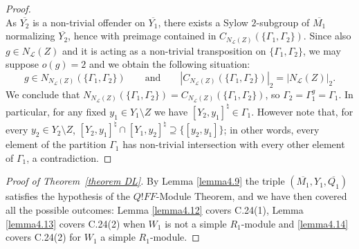 \documentclass{amsart}
\numberwithin{equation}{section}
\theoremstyle{definition}
\theoremstyle{subresult}
\theoremstyle{caseresult}
\renewcommand{\L}{\mathcal{L}}
\newcommand{\ov}{\overline}
\newcommand{\<}{\langle}
\renewcommand{\>}{\rangle}
\begin{document}
\begin{proof}
\[	\]
	As $\ov{Y_2}$ is a non-trivial offender on $\ov{Y_1}$, there exists a Sylow $2$-subgroup of $\ov{M_1}$ normalizing $\ov{Y_2}$, hence with preimage contained in $C_{N_\L(Z)}(\{ \Gamma_1, \Gamma_2 \})$. Since also $g \in N_\L(Z)$ and it is acting as a non-trivial transposition on $\{\Gamma_1,\Gamma_2\}$, we may suppose $o(g)=2$ and we obtain the following situation:
	\[
	g \in N_{N_\L(Z)}(\{\Gamma_1,\Gamma_2\}) \qquad \text{and} \qquad |C_{N_\L(Z)}(\{ \Gamma_1, \Gamma_2 \})|_2 = |N_\L(Z)|_2.
	\]
	We conclude that $N_{N_\L(Z)}(\{\Gamma_1,\Gamma_2\}) = C_{N_\L(Z)}(\{ \Gamma_1, \Gamma_2 \})$, so $\Gamma_2 = \Gamma_1^g = \Gamma_1$. In particular, for any fixed $y_1 \in Y_1 \setminus Z$ we have $[Y_2,y_1]^\natural \in \Gamma_1$. However note that, for every $y_2 \in Y_2 \setminus Z$, $[Y_2,y_1]^\natural \cap [Y_1,y_2]^\natural \supseteq \{ [y_2,y_1] \}$; in other words, every element of the partition $\Gamma_1$ has non-trivial intersection with every other element of $\Gamma_1$, a contradiction.
\end{proof}




\begin{proof}[Proof of Theorem~\ref{theorem DL}]
	By Lemma \ref{lemma4.9} the triple $(\ov{M_1},Y_1, \ov{Q_1})$ satisfies the hypothesis of the $Q!FF$-Module Theorem, \cite[C.24]{Meier-Stell-Stroth:2012} and we have then covered all the possible outcomes: Lemma \ref{lemma4.12} covers C.24(1), Lemma \ref{lemma4.13} covers C.24(2) when $W_1$ is not a simple $R_1$-module and \ref{lemma4.14} covers C.24(2) for $W_1$ a simple $R_1$-module.
\end{proof}








\end{document}
